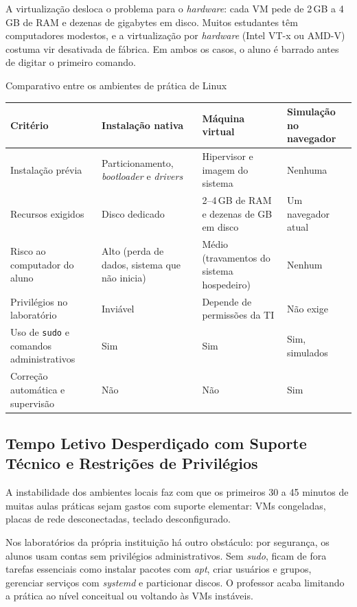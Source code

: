 A virtualização desloca o problema para o \textit{hardware}: cada VM pede de 2\,GB a 4\,GB de RAM e dezenas de gigabytes em disco. Muitos estudantes têm computadores modestos, e a virtualização por \textit{hardware} (Intel VT-x ou AMD-V) costuma vir desativada de fábrica. Em ambos os casos, o aluno é barrado antes de digitar o primeiro comando.

\begin{quadro}[htbp]
    \caption{Comparativo entre os ambientes de prática de Linux}
    \label{qua:comparativo-ambientes}
    \footnotesize
    \begin{tabularx}{\textwidth}{|p{3.6cm}|L|L|L|}
        \hline
        \textbf{Critério} & \textbf{Instalação nativa} & \textbf{Máquina virtual} & \textbf{Simulação no navegador} \\
        \hline
        Instalação prévia & Particionamento, \textit{bootloader} e \textit{drivers} & Hipervisor e imagem do sistema & Nenhuma \\
        \hline
        Recursos exigidos & Disco dedicado & 2--4\,GB de RAM e dezenas de GB em disco & Um navegador atual \\
        \hline
        Risco ao computador do aluno & Alto (perda de dados, sistema que não inicia) & Médio (travamentos do sistema hospedeiro) & Nenhum \\
        \hline
        Privilégios no laboratório & Inviável & Depende de permissões da TI & Não exige \\
        \hline
        Uso de \texttt{sudo} e comandos administrativos & Sim & Sim & Sim, simulados \\
        \hline
        Correção automática e supervisão & Não & Não & Sim \\
        \hline
    \end{tabularx}
\end{quadro}

\subsection{Tempo Letivo Desperdiçado com Suporte Técnico e Restrições de Privilégios}
A instabilidade dos ambientes locais faz com que os primeiros 30 a 45 minutos de muitas aulas práticas sejam gastos com suporte elementar: VMs congeladas, placas de rede desconectadas, teclado desconfigurado.

Nos laboratórios da própria instituição há outro obstáculo: por segurança, os alunos usam contas sem privilégios administrativos. Sem \textit{sudo}, ficam de fora tarefas essenciais como instalar pacotes com \textit{apt}, criar usuários e grupos, gerenciar serviços com \textit{systemd} e particionar discos. O professor acaba limitando a prática ao nível conceitual ou voltando às VMs instáveis.

